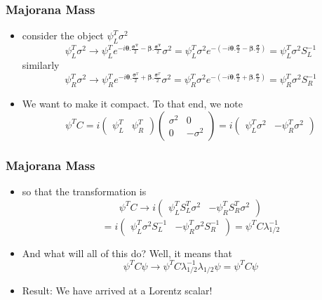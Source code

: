 \documentclass{beamer}
\begin{document}
 
\begin{frame}
	\frametitle{Majorana Mass}
		\begin{itemize}



		\item consider the object $\psi_{L}^{T}\sigma^{2}$	
		\pause
\[
\psi_{L}^{T}\sigma^{2}\rightarrow\psi_{L}^{T}e^{-i\mathbf{\theta}.\frac{\mathbf{\sigma^{T}}}{2}-\mathbf{\beta}.\frac{\mathbf{\sigma^{T}}}{2}}\sigma^{2}=\psi_{L}^{T}\sigma^{2}e^{-\left(-i\mathbf{\theta}.\frac{\mathbf{\sigma}}{2}-\mathbf{\beta}.\frac{\mathbf{\sigma}}{2}\right)}=\psi_{L}^{T}\sigma^{2}S_{L}^{-1}
\]
		\pause
		similarly
\[
\psi_{R}^{T}\sigma^{2}\rightarrow\psi_{R}^{T}e^{-i\mathbf{\theta}.\frac{\mathbf{\sigma}^{T}}{2}+\mathbf{\beta}.\frac{\mathbf{\sigma}^{T}}{2}}\sigma^{2}=\psi_{R}^{T}\sigma^{2}e^{-\left(-i\mathbf{\theta}.\frac{\mathbf{\sigma}}{2}+\mathbf{\beta}.\frac{\mathbf{\sigma}}{2}\right)}=\psi_{R}^{T}\sigma^{2}S_{R}^{-1}
\]
\pause

		\item We want to make it compact. To that end, we note
		\pause
\[
\psi^{T}C=i\left(\begin{array}{cc}
\psi_{L}^{T} & \psi_{R}^{T}\end{array}\right)\left(\begin{array}{cc}
\sigma^{2} & 0\\
0 & -\sigma^{2}
\end{array}\right)=i\left(\begin{array}{cc}
\psi_{L}^{T}\sigma^{2} & -\psi_{R}^{T}\sigma^{2}\end{array}\right)
\]
\pause
	\end{itemize}
\end{frame}

 









 
\begin{frame}
	\frametitle{Majorana Mass}
		\begin{itemize}

		\item so that the transformation is 
		\pause
\[
\psi^{T}C\rightarrow i\left(\begin{array}{cc}
\psi_{L}^{T}S_{L}^{T}\sigma^{2} & -\psi_{R}^{T}S_{R}^{T}\sigma^{2}\end{array}\right)\]
\[=i\left(\begin{array}{cc}
\psi_{L}^{T}\sigma^{2}S_{L}^{-1} & -\psi_{R}^{T}\sigma^{2}S_{R}^{-1}\end{array}\right)=\psi^{T}C\lambda_{1/2}^{-1}
\]
\pause

		\item And what will all of this do? Well, it means that 
		\pause
\[
\psi^{T}C\psi\rightarrow\psi^{T}C\lambda_{1/2}^{-1}\lambda_{1/2}\psi=\psi^{T}C\psi
\]
\pause
		\item Result: We have arrived at a Lorentz scalar!

	\end{itemize}
\end{frame}
\end{document}
